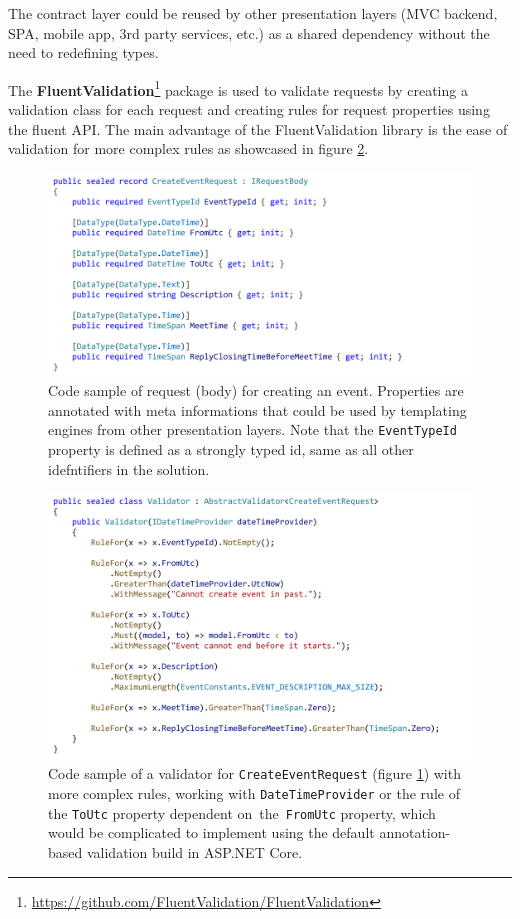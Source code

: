 The contract layer could be reused by other presentation layers (MVC backend, SPA, mobile app, 3rd party services, etc.) as a shared dependency without the need to redefining types.

The \textbf{FluentValidation}\footnote{\url{https://github.com/FluentValidation/FluentValidation}} package is used to validate requests by creating a validation class for each request and creating rules for request properties using the fluent API. The main advantage of the FluentValidation library is the ease of validation for more complex rules as showcased in figure \ref{fig:validator}.

\begin{figure} [H]
    \centering
    \includegraphics[width=\textwidth]{figures/request.pdf}
    \caption{Code sample of request (body) for creating an event. Properties are annotated with meta informations that could be used by templating engines from other presentation layers. Note that the \texttt{EventTypeId} property is defined as a strongly typed id, same as all other idefntifiers in the solution.}
    \label{fig:request}
\end{figure}

\begin{figure} [H]
    \centering
    \includegraphics[width=\textwidth]{figures/validator.pdf}
    \caption{Code sample of a validator for \texttt{CreateEventRequest} (figure \ref{fig:request}) with more complex rules, working with \texttt{DateTimeProvider} or the rule of the \texttt{ToUtc} property dependent on~the~\texttt{FromUtc} property, which would be complicated to implement using the default annotation-based validation build in ASP.NET Core.}
    \label{fig:validator}
\end{figure}

